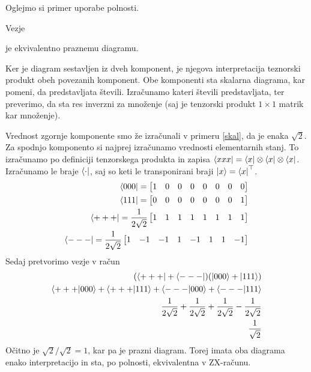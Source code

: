 \documentclass[mat1]{fmfdelo}
\newcommand{\tranp}{\top}
\begin{document}
Oglejmo si primer uporabe polnosti.
\begin{primer}\label{inv-koren}
    Vezje
    \begin{center}
    \end{center}
    je ekvivalentno praznemu diagramu.
    
    Ker je diagram sestavljen iz dveh komponent, je njegova interpretacija teznorski produkt obeh povezanih komponent. Obe komponenti sta skalarna diagrama, kar pomeni, da predstavljata števili. Izračunamo kateri števili predstavljata, ter preverimo, da sta res inverzni za množenje (saj je tenzorski produkt \(1\times 1\) matrik kar množenje).

    Vrednost zgornje komponente smo že izračunali v primeru \ref{skal}, da je enaka \(\sqrt{2}\).
    Za spodnjo komponento si najprej izračunamo vrednosti elementarnih stanj. To izračunamo po definiciji tenzorskega produkta in zapisa \(\bra{xxx} = \bra{x}\otimes \bra{x}\otimes \bra{x}\). Izračunamo le braje \(\bra{\cdot}\), saj so keti le transponirani braji \(\ket{x}=\bra{x}^\tranp\).
    \begin{align*}
        \bra{000} = \begin{bmatrix}
            1&0&0&0& 0&0&0&0
        \end{bmatrix}\\
        \bra{111} = \begin{bmatrix}
            0&0&0&0& 0&0&0&1
        \end{bmatrix}\\
        \bra{+++} = \frac{1}{2\sqrt{2}}\begin{bmatrix}
            1&1&1&1& 1&1&1&1
        \end{bmatrix}\\
        \bra{---} = \frac{1}{2\sqrt{2}} \begin{bmatrix}
            1&-1&-1&1& -1&1&1&-1
        \end{bmatrix}
    \end{align*}
    Sedaj pretvorimo vezje v račun
    \begin{align*}
        (\bra{+++}+\bra{---})(\ket{000}+\ket{111})\\
        \braket{+++}{000}+\braket{+++}{111}+\braket{---}{000}+\braket{---}{111}\\
        \frac{1}{2\sqrt2}+\frac{1}{2\sqrt2}+\frac{1}{2\sqrt2}-\frac{1}{2\sqrt2}\\
        \frac{1}{\sqrt2}
    \end{align*}
    Očitno je \(\sqrt2/\sqrt2 = 1\), kar pa je prazni diagram. Torej imata oba diagrama enako interpretacijo in sta, po polnosti, ekvivalentna v ZX-računu.
\end{primer}
\end{document}
